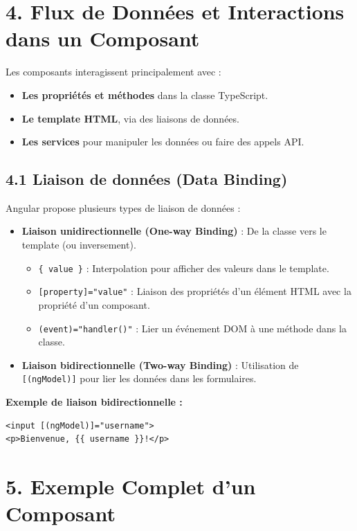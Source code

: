 \documentclass{article}
\begin{document}
\section*{4. Flux de Données et Interactions dans un Composant}

Les composants interagissent principalement avec :
\begin{itemize}
  \item \textbf{Les propriétés et méthodes} dans la classe TypeScript.
  \item \textbf{Le template HTML}, via des liaisons de données.
  \item \textbf{Les services} pour manipuler les données ou faire des appels API.
\end{itemize}

\subsection*{4.1 Liaison de données (Data Binding)}

Angular propose plusieurs types de liaison de données :
\begin{itemize}
  \item \textbf{Liaison unidirectionnelle (One-way Binding)} : De la classe vers le template (ou inversement).
    \begin{itemize}
      \item \texttt{{\{ value \}}} : Interpolation pour afficher des valeurs dans le template.
      \item \texttt{[property]="value"} : Liaison des propriétés d’un élément HTML avec la propriété d’un composant.
      \item \texttt{(event)="handler()"} : Lier un événement DOM à une méthode dans la classe.
    \end{itemize}
  \item \textbf{Liaison bidirectionnelle (Two-way Binding)} : Utilisation de \texttt{[(ngModel)]} pour lier les données dans les formulaires.
\end{itemize}

\textbf{Exemple de liaison bidirectionnelle :}
\begin{verbatim}
<input [(ngModel)]="username">
<p>Bienvenue, {{ username }}!</p>
\end{verbatim}

\section*{5. Exemple Complet d’un Composant}
\end{document}
